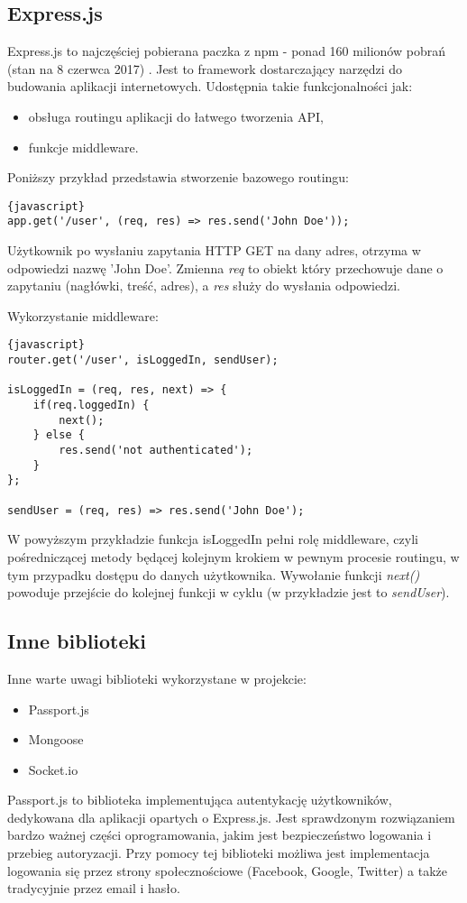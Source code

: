 \documentclass[eng,printmode]{mgr}
\begin{document}
\subsection{Express.js}
Express.js to najczęściej pobierana paczka z npm - ponad 160 milionów pobrań (stan na 8 czerwca 2017) \cite{express_popularity}. Jest to framework dostarczający narzędzi do budowania aplikacji internetowych. Udostępnia takie funkcjonalności jak:
\begin{itemize}
\item obsługa routingu aplikacji do łatwego tworzenia API,
\item funkcje middleware.
\end{itemize}

Poniższy przykład przedstawia stworzenie bazowego routingu:
\begin{lstlisting}{javascript}
app.get('/user', (req, res) => res.send('John Doe'));
\end{lstlisting}
Użytkownik po wysłaniu zapytania HTTP GET na dany adres, otrzyma w odpowiedzi nazwę 'John Doe'. Zmienna \textit{req} to obiekt który przechowuje dane o zapytaniu (nagłówki, treść, adres), a \textit{res} służy do wysłania odpowiedzi.

Wykorzystanie middleware:
\begin{lstlisting}{javascript}
router.get('/user', isLoggedIn, sendUser);

isLoggedIn = (req, res, next) => {
	if(req.loggedIn) {
		next();
	} else {
		res.send('not authenticated');
	}
};

sendUser = (req, res) => res.send('John Doe');
\end{lstlisting}
W powyższym przykładzie funkcja isLoggedIn pełni rolę middleware, czyli pośredniczącej metody będącej kolejnym krokiem w pewnym procesie routingu, w tym przypadku dostępu do danych użytkownika. Wywołanie funkcji \textit{next()} powoduje przejście do kolejnej funkcji w cyklu (w przykładzie jest to \textit{sendUser}).
\subsection{Inne biblioteki}
Inne warte uwagi biblioteki wykorzystane w projekcie:
\begin{itemize}
\item Passport.js
\item Mongoose
\item Socket.io
\end{itemize}
Passport.js to biblioteka implementująca autentykację użytkowników, dedykowana dla aplikacji opartych o Express.js. Jest sprawdzonym rozwiązaniem bardzo ważnej części oprogramowania, jakim jest bezpieczeństwo logowania i przebieg autoryzacji. Przy pomocy tej biblioteki możliwa jest implementacja logowania się przez strony społecznościowe (Facebook, Google, Twitter) a także tradycyjnie przez email i hasło. 
\end{document}
